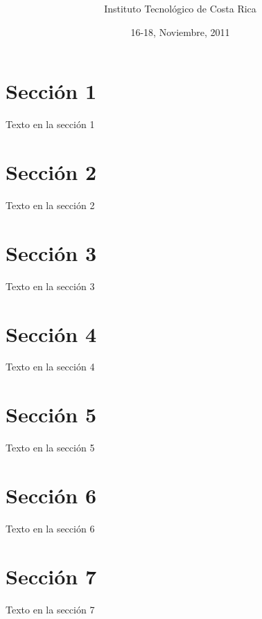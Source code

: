 \documentclass[10pt, notumble, letterpaper]{leaflet}
\title{\vspace*{5cm} }
\author{Instituto Tecnológico de Costa Rica}
\date{16-18, Noviembre, 2011 }
\begin{document}
\maketitle

\thispagestyle{empty}

\section{Sección 1} 

Texto en la sección 1

\newpage

\section{Sección 2} 

Texto en la sección 2

\newpage

\section{Sección 3} 

Texto en la sección 3

\newpage

\section{Sección 4} 

Texto en la sección 4

\newpage

\section{Sección 5} 

Texto en la sección 5

\newpage

\section{Sección 6} 

Texto en la sección 6

\section{Sección 7} 

Texto en la sección 7
\end{document}
